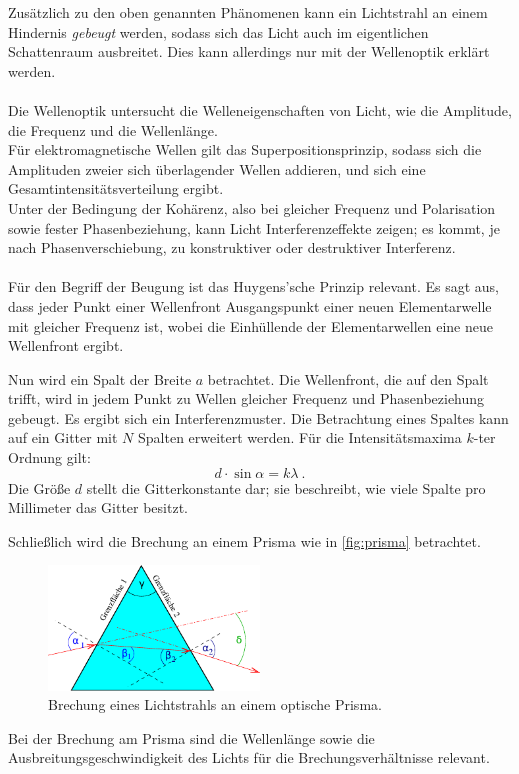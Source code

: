    Zusätzlich zu den oben genannten Phänomenen kann ein Lichtstrahl an einem Hindernis \textit{gebeugt} werden,
    sodass sich das Licht auch im eigentlichen Schattenraum ausbreitet.
    Dies kann allerdings nur mit der Wellenoptik erklärt werden.\\
    \\
    Die Wellenoptik untersucht die Welleneigenschaften von Licht,
    wie die Amplitude, die Frequenz und die Wellenlänge.\\
    Für elektromagnetische Wellen gilt das Superpositionsprinzip,
    sodass sich die Amplituden zweier sich überlagender Wellen addieren,
    und sich eine Gesamtintensitätsverteilung ergibt.\\
    Unter der Bedingung der Kohärenz,
    also bei gleicher Frequenz und Polarisation sowie fester Phasenbeziehung,
    kann Licht Interferenzeffekte zeigen;
    es kommt, je nach Phasenverschiebung,
    zu konstruktiver oder destruktiver Interferenz.\\
    \\
    Für den Begriff der Beugung ist das Huygens'sche Prinzip relevant.
    Es sagt aus,
    dass jeder Punkt einer Wellenfront Ausgangspunkt einer neuen Elementarwelle mit gleicher Frequenz ist,
    wobei die Einhüllende der Elementarwellen eine neue Wellenfront ergibt.

    Nun wird ein Spalt der Breite $a$ betrachtet.
    Die Wellenfront,
    die auf den Spalt trifft,
    wird in jedem Punkt zu Wellen gleicher Frequenz und Phasenbeziehung gebeugt.
    Es ergibt sich ein Interferenzmuster.
    Die Betrachtung eines Spaltes kann auf ein Gitter mit $N$ Spalten erweitert werden.
    Für die Intensitätsmaxima $k$-ter Ordnung gilt:
    \begin{equation}
        d \cdot \sin\alpha = k \lambda \ .
        \label{eqn:intensitaetsmaxima}
    \end{equation}
    Die Größe $d$ stellt die Gitterkonstante dar;
    sie beschreibt,
    wie viele Spalte pro Millimeter das Gitter besitzt.


    Schließlich wird die Brechung an einem Prisma wie in \autoref{fig:prisma} betrachtet.
    \begin{figure}[H]
        \centering
        \includegraphics[width=0.5\textwidth]{content/img/Abb_6.pdf}
        \caption{Brechung eines Lichtstrahls an einem optische Prisma. \cite{versuchsanleitung}}
        \label{fig:prisma}
    \end{figure}
    Bei der Brechung am Prisma sind die Wellenlänge sowie die Ausbreitungsgeschwindigkeit des Lichts
    für die Brechungsverhältnisse relevant.

